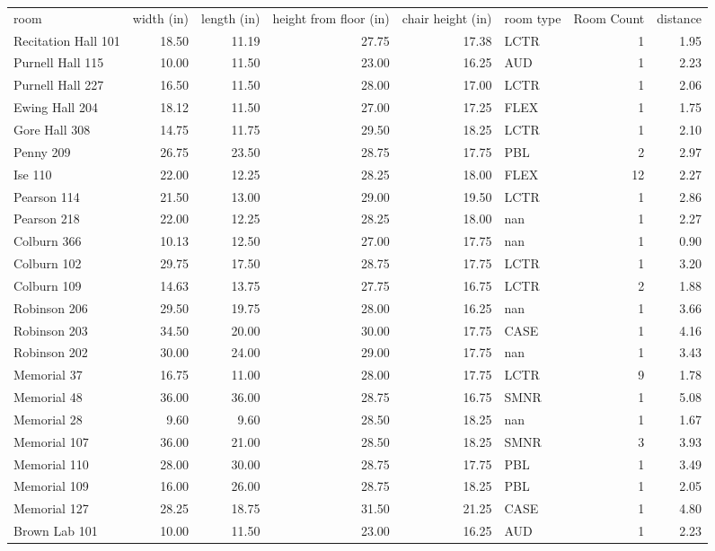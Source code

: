 \begin{tabular}{lrrrrlrr}
room & width (in) & length (in) & height from floor (in) & chair height (in) & room type & Room Count & distance \\
Recitation Hall 101 & 18.50 & 11.19 & 27.75 & 17.38 & LCTR & 1 & 1.95 \\
Purnell Hall 115 & 10.00 & 11.50 & 23.00 & 16.25 & AUD & 1 & 2.23 \\
Purnell Hall 227 & 16.50 & 11.50 & 28.00 & 17.00 & LCTR & 1 & 2.06 \\
Ewing Hall 204 & 18.12 & 11.50 & 27.00 & 17.25 & FLEX & 1 & 1.75 \\
Gore Hall 308 & 14.75 & 11.75 & 29.50 & 18.25 & LCTR & 1 & 2.10 \\
Penny 209 & 26.75 & 23.50 & 28.75 & 17.75 & PBL & 2 & 2.97 \\
Ise 110 & 22.00 & 12.25 & 28.25 & 18.00 & FLEX & 12 & 2.27 \\
Pearson 114 & 21.50 & 13.00 & 29.00 & 19.50 & LCTR & 1 & 2.86 \\
Pearson 218 & 22.00 & 12.25 & 28.25 & 18.00 & nan & 1 & 2.27 \\
Colburn 366 & 10.13 & 12.50 & 27.00 & 17.75 & nan & 1 & 0.90 \\
Colburn 102 & 29.75 & 17.50 & 28.75 & 17.75 & LCTR & 1 & 3.20 \\
Colburn 109 & 14.63 & 13.75 & 27.75 & 16.75 & LCTR & 2 & 1.88 \\
Robinson 206 & 29.50 & 19.75 & 28.00 & 16.25 & nan & 1 & 3.66 \\
Robinson 203 & 34.50 & 20.00 & 30.00 & 17.75 & CASE & 1 & 4.16 \\
Robinson 202 & 30.00 & 24.00 & 29.00 & 17.75 & nan & 1 & 3.43 \\
Memorial 37 & 16.75 & 11.00 & 28.00 & 17.75 & LCTR & 9 & 1.78 \\
Memorial 48 & 36.00 & 36.00 & 28.75 & 16.75 & SMNR & 1 & 5.08 \\
Memorial 28 & 9.60 & 9.60 & 28.50 & 18.25 & nan & 1 & 1.67 \\
Memorial 107 & 36.00 & 21.00 & 28.50 & 18.25 & SMNR & 3 & 3.93 \\
Memorial 110 & 28.00 & 30.00 & 28.75 & 17.75 & PBL & 1 & 3.49 \\
Memorial 109 & 16.00 & 26.00 & 28.75 & 18.25 & PBL & 1 & 2.05 \\
Memorial 127 & 28.25 & 18.75 & 31.50 & 21.25 & CASE & 1 & 4.80 \\
Brown Lab 101 & 10.00 & 11.50 & 23.00 & 16.25 & AUD & 1 & 2.23 \\

\end{tabular}
